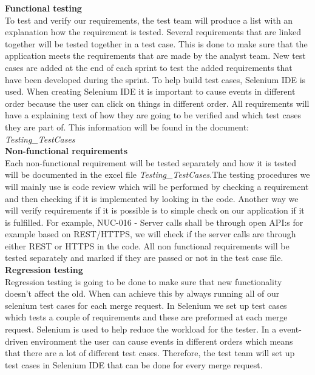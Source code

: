 \noindent\textbf{Functional testing}\\
To test and verify our requirements, the test team will produce a list with an explanation how the requirement is tested. Several requirements that are linked together will be tested together in a test case. This is done to make sure that the application meets the requirements that are made by the analyst team. New test cases are added at the end of each sprint to test the added requirements that have been developed during the sprint. To help build test cases, Selenium IDE is used. When creating Selenium IDE it is important to cause events in different order because the user can click on things in different order. All requirements will have a explaining text of how they are going to be verified and which test cases they are part of. This information will be found in the document: \textit{Testing\_TestCases}  \\

\noindent\textbf{Non-functional requirements}\\
Each non-functional requirement will be tested separately and how it is tested will be documented in the excel file \textit{Testing\_TestCases}.The testing procedures we will mainly use is code review which will be performed by checking a requirement and then checking if it is implemented by looking in the code. Another way we will verify requirements if it is possible is to simple check on our application if it is fulfilled. For example, NUC-016 - Server calls shall be through open API:s for example based on REST/HTTPS, we will check if the server calls are through either REST or HTTPS in the code. All non functional requirements will be tested separately and marked if they are passed or not in the test case file. \\

\noindent \textbf{Regression testing}\\
Regression testing is going to be done to make sure that new functionality doesn't affect the old. When can achieve this by always running all of our selenium test cases for each merge request. In Selenium we set up test cases which tests a couple of requirements and these are preformed at each merge request. Selenium is used to help reduce the workload for the tester. In a event-driven environment the user can cause events in different orders which means that there are a lot of different test cases. Therefore, the test team will set up test cases in Selenium IDE that can be done for every merge request.\\

